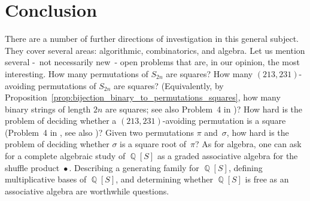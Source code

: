 \documentclass[a4paper]{llncs}
\DeclareMathOperator{\QQ}{\mathbb{Q}}
\DeclareMathOperator{\SHUFFLE}{\bullet}
\begin{document}

\section{Conclusion}
\label{section:Conclusion}

There are a number of further directions of investigation in this
general subject. They cover several areas: algorithmic, combinatorics,
and algebra. Let us mention several -~not necessarily new~- open
problems that are, in our opinion, the most interesting. How many
permutations of $S_{2n}$ are squares? How many $(213,231)$-avoiding
permutations of $S_{2n}$ are squares? (Equivalently, by
Proposition~\ref{prop:bijection_binary_to_permutations_squares},
how many binary strings of length $2n$ are squares; see also Problem~4
in \cite{Henshall:Rampersad:Shallit:2011})? How hard is the problem of
deciding whether a $(213,231)$-avoiding permutation is a square
(Problem~4 in \cite{Henshall:Rampersad:Shallit:2011},
see also \cite{Buss:Soltys:2014,Rizzi:Vialette:CSR:2013})?
Given two permutations $\pi$ and~$\sigma$, how hard is the problem of
deciding whether $\sigma$ is a square root of~$\pi$?
As for algebra, one can ask for a complete algebraic study of
$\QQ[S]$ as a graded associative algebra for the shuffle  product
$\SHUFFLE$. Describing a generating family for $\QQ[S]$, defining
multiplicative bases of $\QQ[S]$, and determining whether $\QQ[S]$ is
free as an associative algebra are worthwhile questions.







\end{document}
